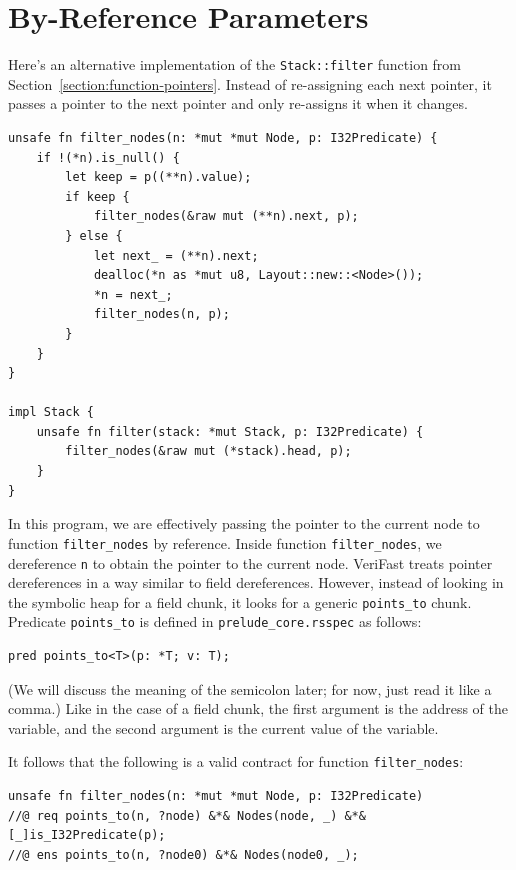 \documentclass{article}
\begin{document}
\section{By-Reference Parameters}\label{section:byref-params}

Here's an alternative implementation of the
\lstinline!Stack::filter! function from
Section~\ref{section:function-pointers}. Instead of
re-assigning each next pointer, it passes a pointer to the next
pointer and only re-assigns it when it changes.
\begin{lstlisting}
unsafe fn filter_nodes(n: *mut *mut Node, p: I32Predicate) {
    if !(*n).is_null() {
        let keep = p((**n).value);
        if keep {
            filter_nodes(&raw mut (**n).next, p);
        } else {
            let next_ = (**n).next;
            dealloc(*n as *mut u8, Layout::new::<Node>());
            *n = next_;
            filter_nodes(n, p);
        }
    }
}

impl Stack {
    unsafe fn filter(stack: *mut Stack, p: I32Predicate) {
        filter_nodes(&raw mut (*stack).head, p);
    }
}
\end{lstlisting}
In this program, we are effectively passing the pointer to the
current node to function \lstinline!filter_nodes! by reference.
Inside function \lstinline!filter_nodes!, we dereference
\lstinline!n! to obtain the pointer to the current node.
VeriFast treats pointer dereferences in a way similar to field
dereferences. However, instead of looking in the symbolic heap
for a field chunk, it looks for a generic \lstinline|points_to| chunk. Predicate \lstinline!points_to! is
defined in \texttt{prelude\_core.rsspec} as follows:
\begin{lstlisting}
pred points_to<T>(p: *T; v: T);
\end{lstlisting}
(We will discuss the meaning of the semicolon later; for now,
just read it like a comma.) Like in the case of a field chunk,
the first argument is the address of the variable, and the
second argument is the current value of the variable.

It follows that the following is a valid contract for function
\lstinline!filter_nodes!:
\begin{lstlisting}
unsafe fn filter_nodes(n: *mut *mut Node, p: I32Predicate)
//@ req points_to(n, ?node) &*& Nodes(node, _) &*& [_]is_I32Predicate(p);
//@ ens points_to(n, ?node0) &*& Nodes(node0, _);
\end{lstlisting}
\end{document}
